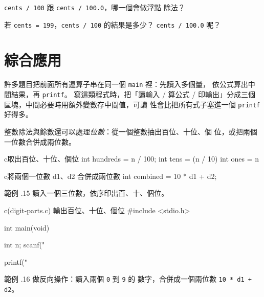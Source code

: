
\begin{drills}[label=drills:arith-float-cast]
\item \texttt{cents / 100} 跟 \texttt{cents / 100.0}，哪一個會做浮點
除法？
\item 若 \texttt{cents = 199}，\texttt{cents / 100} 的結果是多少？
\texttt{cents / 100.0} 呢？
\end{drills}

\section{綜合應用}
\label{sec:arith-synthesis}

許多題目把前面所有運算子串在同一個 \texttt{main} 裡：先讀入多個量，
依公式算出中間結果，再 \texttt{printf}。 寫這類程式時，把「讀輸入 /
算公式 / 印輸出」分成三個區塊，中間必要時用額外變數存中間值，可讀
性會比把所有式子塞進一個 \texttt{printf} 好得多。

整數除法與餘數還可以處理\emph{位數}：從一個整數抽出百位、十位、個
位，或把兩個一位數合併成兩位數。

\begin{code}{c}{取出百位、十位、個位}
int hundreds = n / 100;
int tens = (n / 10) %
int ones = n %
\end{code}

\begin{code}{c}{將兩個一位數 d1、d2 合併成兩位數}
int combined = 10 * d1 + d2;
\end{code}

範例 \thechapter.15 讀入一個三位數，依序印出百、十、個位。

\begin{example}{c}{(digit-parts.c) 輸出百位、十位、個位}
#include <stdio.h>

int main(void) {
    int n;
    scanf("%

    printf("%
}
\end{example}


範例 \thechapter.16 做反向操作：讀入兩個 \texttt{0} 到 \texttt{9} 的
數字，合併成一個兩位數 \texttt{10 * d1 + d2}。

